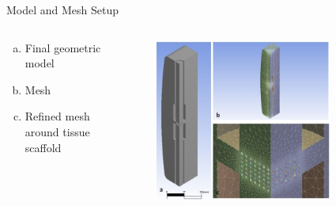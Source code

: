 \documentclass[11pt,t]{beamer}
\begin{document}
\begin{frame}[fragile]{Model and Mesh Setup}  

	\begin{columns}[t]
		\begin{column}{.40\textwidth}
		\begin{enumerate}[a)]
		\item
		Final geometric model
		\item
		Mesh
		\item
		Refined mesh around tissue scaffold
		\end{enumerate}
	
 
		\end{column}
		\begin{column}{.60\textwidth}
			\vspace{-30pt}
			\begin{figure}
			\centering
			\includegraphics[width=0.8\textwidth]{flow_mesh}
			
			\end{figure}
		\end{column}
	\end{columns}	
		
\end{frame}
\end{document}

